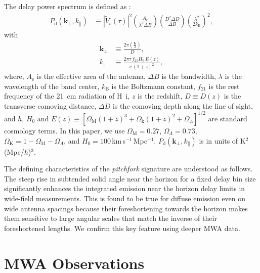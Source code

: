 \documentclass[preprint2,apjl,numberedappendix,twocolappendix,appendixfloats]{emulateapj}
\begin{document}
The delay power spectrum is defined as \citep[][Paper~I]{par12a}:
\begin{align}\label{eqn:delay-power-spectrum}
  P_\textrm{d}(\boldsymbol{k}_\perp,k_\parallel) &\equiv |\widetilde{V}_b(\tau)|^2\left(\frac{A_\textrm{e}}{\lambda^2\Delta B}\right)\left(\frac{D^2\Delta D}{\Delta B}\right)\left(\frac{\lambda^2}{2k_\textrm{B}}\right)^2,
\end{align}
with
\begin{align}
  \boldsymbol{k}_\perp &\equiv \frac{2\pi(\frac{\boldsymbol{b}}{\lambda})}{D}, \\
  k_\parallel &\equiv \frac{2\pi\tau\,f_{21}H_0\,E(z)}{c\,(1+z)^2}, 
\end{align}
where, $A_\textrm{e}$ is the effective area of the antenna, $\Delta B$ is the bandwidth, $\lambda$ is the wavelength of the band center, $k_\textrm{B}$ is the Boltzmann constant, $f_{21}$ is the rest frequency of the 21~cm radiation of H~{\sc i}, $z$ is the redshift, $D\equiv D(z)$ is the transverse comoving distance, $\Delta D$ is the comoving depth along the line of sight, and $h$, $H_0$ and $E(z)\equiv [\Omega_\textrm{M}(1+z)^3+\Omega_\textrm{k}(1+z)^2+\Omega_\Lambda]^{1/2}$ are standard cosmology terms. In this paper, we use $\Omega_\textrm{M}=0.27$, $\Omega_\Lambda=0.73$, $\Omega_\textrm{K}=1-\Omega_\textrm{M}-\Omega_\Lambda$, and $H_0=100\,$km$\,$s$^{-1}\,$Mpc$^{-1}$. $P_\textrm{d}(\boldsymbol{k}_\perp,k_\parallel)$ is in units of K$^2$(Mpc/$h$)$^3$.

The defining characteristics of the {\it pitchfork} signature are understood as follows. The steep rise in subtended solid angle near the horizon for a fixed delay bin size significantly enhances the integrated emission near the horizon delay limits in wide-field measurements. This is found to be true for diffuse emission even on wide antenna spacings because their foreshortening towards the horizon makes them sensitive to large angular scales that match the inverse of their foreshortened lengths. We confirm this key feature using deeper MWA data.

\section{MWA Observations}\label{sec:MWA}
\end{document}
